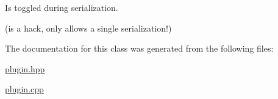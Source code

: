 Is toggled during serialization. 

(is a hack, only allows a single serialization!) 

The documentation for this class was generated from the following files\-:\begin{DoxyCompactItemize}
\item 
\hyperlink{plugin_8hpp}{plugin.\-hpp}\item 
\hyperlink{plugin_8cpp}{plugin.\-cpp}\end{DoxyCompactItemize}
